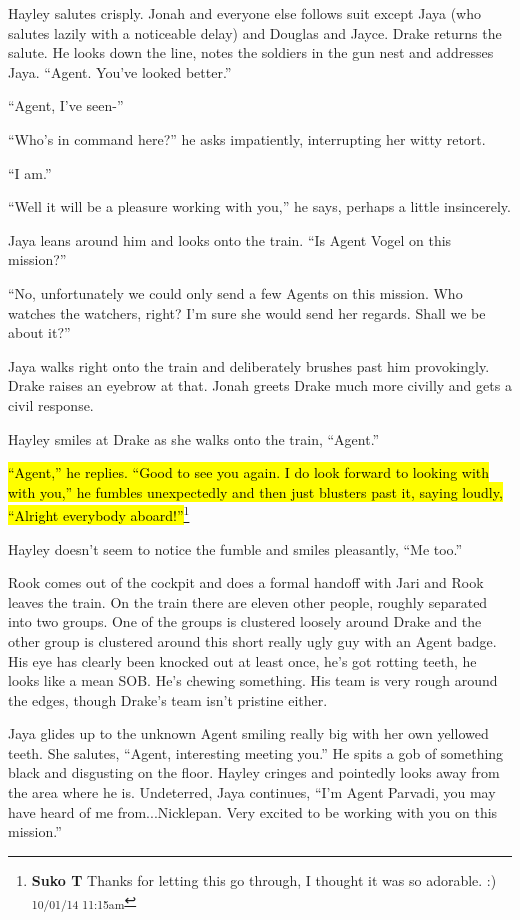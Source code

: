 Hayley salutes crisply.  Jonah and everyone else follows suit except Jaya (who salutes lazily with a noticeable delay) and Douglas and Jayce.  Drake returns the salute.  He looks down the line, notes the soldiers in the gun nest and addresses Jaya.  ``Agent.  You've looked better.''

``Agent, I've seen-''

``Who's in command here?'' he asks impatiently, interrupting her witty retort.

``I am.''

``Well it will be a pleasure working with you,'' he says, perhaps a little insincerely.

Jaya leans around him and looks onto the train.  ``Is Agent Vogel on this mission?''

``No, unfortunately we could only send a few Agents on this mission.  Who watches the watchers, right?  I'm sure she would send her regards.  Shall we be about it?''

Jaya walks right onto the train and deliberately brushes past him provokingly.  Drake raises an eyebrow at that.  Jonah greets Drake much more civilly and gets a civil response.

Hayley smiles at Drake as she walks onto the train, ``Agent.''

\hl{``Agent,'' he replies.  ``Good to see you again. I do look forward to looking with with you,'' he fumbles unexpectedly and then just blusters past it, saying loudly, ``Alright everybody aboard!''}\footnote{\textbf{Suko T }Thanks for letting this go through, I thought it was so adorable. :) \textsubscript{10/01/14 11:15am}}

Hayley doesn't seem to notice the fumble and smiles pleasantly, ``Me too.''





Rook comes out of the cockpit and does a formal handoff with Jari and Rook leaves the train.  On the train there are eleven other people, roughly separated into two groups.  One of the groups is clustered loosely around Drake and the other group is clustered around this short really ugly guy with an Agent badge.  His eye has clearly been knocked out at least once, he's got rotting teeth, he looks like a mean SOB.   He's chewing something.  His team is very rough around the edges, though Drake's team isn't pristine either.



Jaya glides up to the unknown Agent smiling really big with her own yellowed teeth.  She salutes, ``Agent, interesting meeting you.''  He spits a gob of something black and disgusting on the floor.  Hayley cringes and pointedly looks away from the area where he is.  Undeterred, Jaya continues, ``I'm Agent Parvadi, you may have heard of me from...Nicklepan.  Very excited to be working with you on this mission.''

